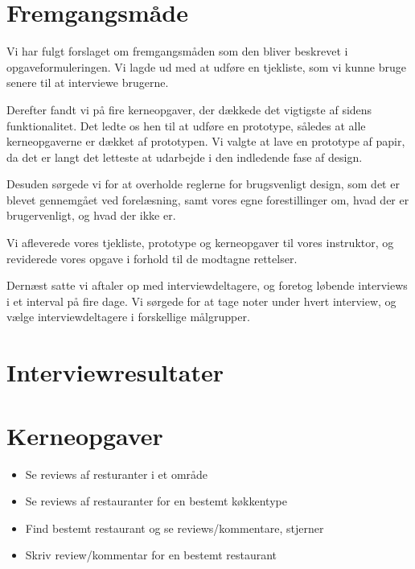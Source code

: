 \documentclass[a4paper, 12pt]{article}
\begin{document}


\newpage

\tableofcontents

\newpage
\setcounter{page}{1}
\fancyfoot[C]{\thepage}

\section{Fremgangsmåde}
\label{sec:Fremgangsmaade}

Vi har fulgt forslaget om fremgangsmåden som den bliver beskrevet i
opgaveformuleringen. Vi lagde ud med at udføre en tjekliste, som vi kunne bruge
senere til at interviewe brugerne.

Derefter fandt vi på fire kerneopgaver, der dækkede det vigtigste af sidens
funktionalitet. Det ledte os hen til at udføre en prototype, således at alle
kerneopgaverne er dækket af prototypen. Vi valgte at lave en prototype af papir,
da det er langt det letteste at udarbejde i den indledende fase af design.

Desuden sørgede vi for at overholde reglerne for brugsvenligt design, som det er
blevet gennemgået ved forelæsning, samt vores egne forestillinger om, hvad der
er brugervenligt, og hvad der ikke er.

Vi afleverede vores tjekliste, prototype og kerneopgaver til vores instruktor,
og reviderede vores opgave i forhold til de modtagne rettelser.

Dernæst satte vi aftaler op med interviewdeltagere, og foretog løbende
interviews i et interval på fire dage. Vi sørgede for at tage noter under hvert
interview, og vælge interviewdeltagere i forskellige målgrupper.

\section{Interviewresultater}
\label{sec:Interviewresultater}

\section{Kerneopgaver}
\label{sec:Kerneopgaver}
\begin{itemize}
\item Se reviews af resturanter i et område
\item Se reviews af restauranter for en bestemt køkkentype
\item Find bestemt restaurant og se reviews/kommentare, stjerner
\item Skriv review/kommentar for en bestemt restaurant
\end{itemize}
\end{document}
